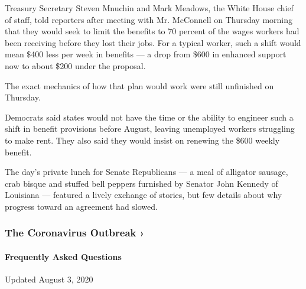 Treasury Secretary Steven Mnuchin and Mark Meadows, the White House
chief of staff, told reporters after meeting with Mr. McConnell on
Thursday morning that they would seek to limit the benefits to 70
percent of the wages workers had been receiving before they lost their
jobs. For a typical worker, such a shift would mean \$400 less per week
in benefits --- a drop from \$600 in enhanced support now to about \$200
under the proposal.

The exact mechanics of how that plan would work were still unfinished on
Thursday.

Democrats said states would not have the time or the ability to engineer
such a shift in benefit provisions before August, leaving unemployed
workers struggling to make rent. They also said they would insist on
renewing the \$600 weekly benefit.

The day's private lunch for Senate Republicans --- a meal of alligator
sausage, crab bisque and stuffed bell peppers furnished by Senator John
Kennedy of Louisiana --- featured a lively exchange of stories, but few
details about why progress toward an agreement had slowed.

\href{https://www.nytimes.com/news-event/coronavirus?action=click\&pgtype=Article\&state=default\&region=MAIN_CONTENT_3\&context=storylines_faq}{}

\hypertarget{the-coronavirus-outbreak-}{%
\subsubsection{The Coronavirus Outbreak
›}\label{the-coronavirus-outbreak-}}

\hypertarget{frequently-asked-questions}{%
\paragraph{Frequently Asked
Questions}\label{frequently-asked-questions}}

Updated August 3, 2020

